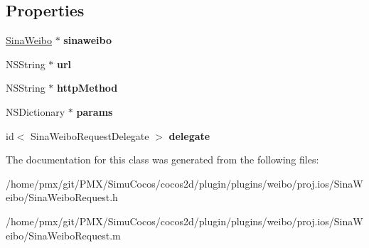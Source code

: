 \subsection*{Properties}
\begin{DoxyCompactItemize}
\item 
\mbox{\label{interfaceSinaWeiboRequest_adafe8a6df8defc84e9a7d00ba8a1ed5c}} 
\hyperlink{interfaceSinaWeibo}{Sina\+Weibo} $\ast$ {\bfseries sinaweibo}
\item 
\mbox{\label{interfaceSinaWeiboRequest_a8a2341d06ac5af9144b8d6fc02b1b4c2}} 
N\+S\+String $\ast$ {\bfseries url}
\item 
\mbox{\label{interfaceSinaWeiboRequest_a8b0460291c08c856be7f01917e4e063a}} 
N\+S\+String $\ast$ {\bfseries http\+Method}
\item 
\mbox{\label{interfaceSinaWeiboRequest_aac1232b0a5532ba86a05f9d4504185a2}} 
N\+S\+Dictionary $\ast$ {\bfseries params}
\item 
\mbox{\label{interfaceSinaWeiboRequest_a6f13965e1b4fcea6ad10aa0f15639ae1}} 
id$<$ Sina\+Weibo\+Request\+Delegate $>$ {\bfseries delegate}
\end{DoxyCompactItemize}


The documentation for this class was generated from the following files\+:\begin{DoxyCompactItemize}
\item 
/home/pmx/git/\+P\+M\+X/\+Simu\+Cocos/cocos2d/plugin/plugins/weibo/proj.\+ios/\+Sina\+Weibo/Sina\+Weibo\+Request.\+h\item 
/home/pmx/git/\+P\+M\+X/\+Simu\+Cocos/cocos2d/plugin/plugins/weibo/proj.\+ios/\+Sina\+Weibo/Sina\+Weibo\+Request.\+m\end{DoxyCompactItemize}
